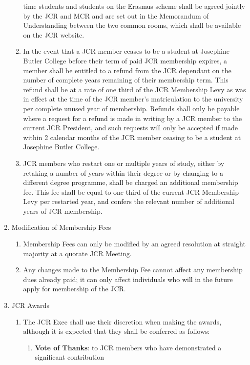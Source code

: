 \begin{enumerate}
\begin{enumerate}
        time students and students on the Erasmus scheme shall be agreed jointly by the JCR and MCR
        and are set out in the Memorandum of Understanding between the two common rooms, which
        shall be available on the JCR website.
        \item In the event that a JCR member ceases to be a student at Josephine Butler College before their
        term of paid JCR membership expires, a member shall be entitled to a refund from the JCR
        dependant on the number of complete years remaining of their membership term. This refund
        shall be at a rate of one third of the JCR Membership Levy as was in effect at the time of the JCR
        member’s matriculation to the university per complete unused year of membership. Refunds shall
        only be payable where a request for a refund is made in writing by a JCR member to the current
        JCR President, and such requests will only be accepted if made within 2 calendar months of the
        JCR member ceasing to be a student at Josephine Butler College.
        \item JCR members who restart one or multiple years of study, either by retaking a number of years
        within their degree or by changing to a different degree programme, shall be charged an
        additional membership fee. This fee shall be equal to one third of the current JCR Membership
        Levy per restarted year, and confers the relevant number of additional years of JCR membership.
    \end{enumerate}
    \item Modification of Membership Fees
    \begin{enumerate}
        \item Membership Fees can only be modified by an agreed resolution at straight majority at a quorate
        JCR Meeting.
        \item Any changes made to the Membership Fee cannot affect any membership dues already paid; it
        can only affect individuals who will in the future apply for membership of the JCR.
    \end{enumerate}
    \item JCR Awards
    \begin{enumerate}
        \item The JCR Exec shall use their discretion when making the awards, although it is expected that they
        shall be conferred as follows:
        \begin{enumerate}
            \item \textbf{Vote of Thanks}: to JCR members who have demonstrated a significant contribution

\end{enumerate}
\end{enumerate}
\end{enumerate}
